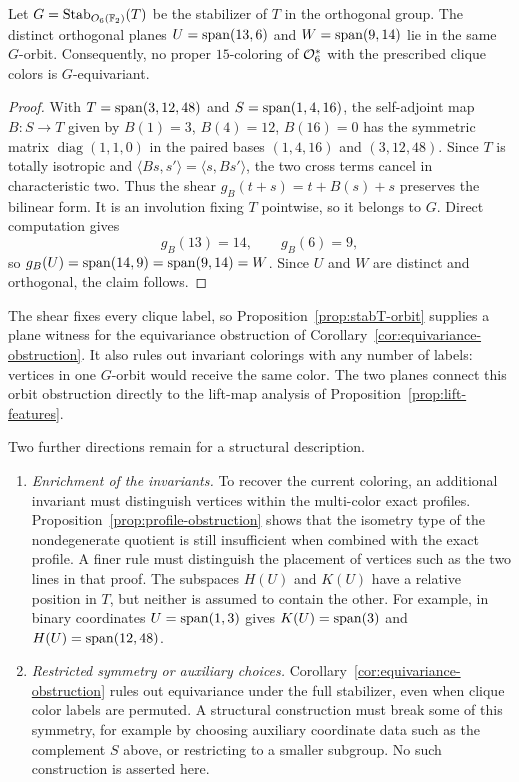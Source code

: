 \begin{proposition}
\label{prop:stabT-orbit}
Let \(G=\operatorname{Stab}_{O_6(\mathbb F_2)}(T)\) be the stabilizer of
\(T\) in the orthogonal group.  The distinct orthogonal planes
\(U=\operatorname{span}(13,6)\) and \(W=\operatorname{span}(9,14)\) lie in the same \(G\)-orbit.
Consequently, no proper \(15\)-coloring of \(\mathcal O_6^*\) with the
prescribed clique colors is \(G\)-equivariant.
\end{proposition}
\begin{proof}
With \(T=\operatorname{span}(3,12,48)\) and \(S=\operatorname{span}(1,4,16)\), the self-adjoint
map \(B:S\to T\) given by \(B(1)=3\), \(B(4)=12\), \(B(16)=0\)
has the symmetric matrix \(\operatorname{diag}(1,1,0)\) in the
paired bases \((1,4,16)\) and \((3,12,48)\). Since \(T\) is totally
isotropic and \(\langle Bs,s'\rangle=\langle s,Bs'\rangle\),
the two cross terms cancel in characteristic two. Thus the shear
\(g_B(t+s)=t+B(s)+s\) preserves the bilinear form. It is an
involution fixing \(T\) pointwise, so it belongs to \(G\).
Direct computation gives
\[
g_B(13)=14,\qquad g_B(6)=9,
\]
so \(g_B(U)=\operatorname{span}(14,9)=\operatorname{span}(9,14)=W\).  Since \(U\) and \(W\) are
distinct and orthogonal, the claim follows.
\end{proof}

The shear fixes every clique label, so
Proposition~\ref{prop:stabT-orbit} supplies a plane witness for the
equivariance obstruction of Corollary~\ref{cor:equivariance-obstruction}.
It also rules out invariant colorings with any number of labels:
vertices in one \(G\)-orbit would receive the same color. The two
planes connect this orbit obstruction directly to the lift-map
analysis of Proposition~\ref{prop:lift-features}.

Two further directions remain for a structural description.

\begin{enumerate}
\item \emph{Enrichment of the invariants.}  To recover the current
coloring, an additional invariant must distinguish vertices within
the multi-color exact profiles.  Proposition~\ref{prop:profile-obstruction}
shows that the isometry type of the nondegenerate quotient is still
insufficient when combined with the exact profile.  A finer rule must
distinguish the placement of vertices such as the two lines in that
proof.
The subspaces \(H(U)\) and \(K(U)\) have a relative position in
\(T\), but neither is assumed to contain the other.  For example,
in binary coordinates \(U=\operatorname{span}(1,3)\) gives
\(K(U)=\operatorname{span}(3)\) and \(H(U)=\operatorname{span}(12,48)\).

\item \emph{Restricted symmetry or auxiliary choices.}
Corollary~\ref{cor:equivariance-obstruction} rules out equivariance
under the full stabilizer, even when clique color labels are permuted.
A structural construction must break some of this symmetry, for
example by choosing auxiliary coordinate data such as the complement
\(S\) above, or restricting to a smaller subgroup.  No such
construction is asserted here.
\end{enumerate}
